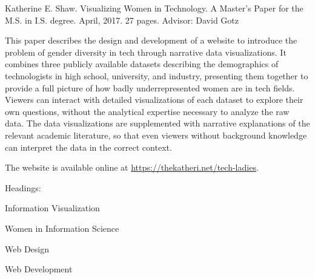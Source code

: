 \documentclass{article}
\newcommand{\mytitle}{Visualizing Women in Technology}
\begin{document}
\thispagestyle{empty}
\singlespace
\noindent Katherine E. Shaw. \mytitle. A Master's Paper for the M.S. in I.S. degree. April, 2017. 27 pages. Advisor: David Gotz

\vspace{0.2in} %

\noindent This paper describes the design and development of a website to introduce the problem of gender diversity in tech through narrative data visualizations. It combines three publicly available datasets describing the demographics of technologists in high school, university, and industry, presenting them together to provide a full picture of how badly underrepresented women are in tech fields. Viewers can interact with detailed visualizations of each dataset to explore their own questions, without the analytical expertise necessary to analyze the raw data. The data visualizations are supplemented with narrative explanations of the relevant academic literature, so that even viewers without background knowledge can interpret the data in the correct context.

\vspace{0.2in} %

\noindent The website is available online at \url{https://thekatheri.net/tech-ladies}.

\vspace{1in} %

\doublespace
\noindent Headings:

Information Visualization

Women in Information Science

Web Design

Web Development


\clearpage
\end{document}
